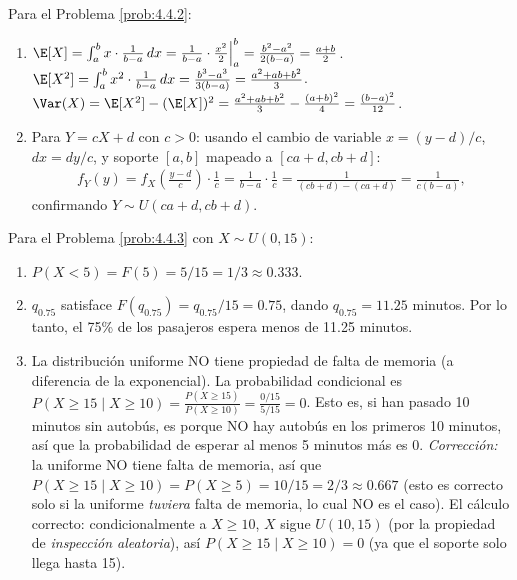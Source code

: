 \begin{solucion}
	\label{sol:4.4.2}
	Para el Problema \ref{prob:4.4.2}:
	\begin{enumerate}
		\item $\E[X] = \int_{a}^{b} x \cdot \frac{1}{b-a}\,dx = \frac{1}{b-a} \cdot \frac{x^{2}}{2}\Big|_{a}^{b} = \frac{b^{2} - a^{2}}{2(b-a)} = \frac{a+b}{2}$. $\E[X^{2}] = \int_{a}^{b} x^{2} \cdot \frac{1}{b-a}\,dx = \frac{b^{3} - a^{3}}{3(b-a)} = \frac{a^{2} + ab + b^{2}}{3}$. $\Var(X) = \E[X^{2}] - (\E[X])^{2} = \frac{a^{2} + ab + b^{2}}{3} - \frac{(a+b)^{2}}{4} = \frac{(b-a)^{2}}{12}$.
		\item Para $Y = cX + d$ con $c > 0$: usando el cambio de variable $x = (y-d)/c$, $dx = dy/c$, y soporte $[a, b]$ mapeado a $[ca+d, cb+d]$:
		\begin{align*}
			f_{Y}(y) = f_{X}\left(\frac{y-d}{c}\right) \cdot \frac{1}{c} = \frac{1}{b-a} \cdot \frac{1}{c} = \frac{1}{(cb+d) - (ca+d)} = \frac{1}{c(b-a)},
		\end{align*}
		confirmando $Y \sim U(ca+d, cb+d)$.
	\end{enumerate}
\end{solucion}

\begin{solucion}
	\label{sol:4.4.3}
	Para el Problema \ref{prob:4.4.3} con $X \sim U(0, 15)$:
	\begin{enumerate}
		\item $P(X < 5) = F(5) = 5/15 = 1/3 \approx 0.333$.
		\item $q_{0.75}$ satisface $F(q_{0.75}) = q_{0.75}/15 = 0.75$, dando $q_{0.75} = 11.25$ minutos. Por lo tanto, el 75\% de los pasajeros espera menos de 11.25 minutos.
		\item La distribución uniforme NO tiene propiedad de falta de memoria (a diferencia de la exponencial). La probabilidad condicional es $P(X \ge 15 \mid X \ge 10) = \frac{P(X \ge 15)}{P(X \ge 10)} = \frac{0/15}{5/15} = 0$. Esto es, si han pasado 10 minutos sin autobús, es porque NO hay autobús en los primeros 10 minutos, así que la probabilidad de esperar al menos 5 minutos más es 0. \emph{Corrección:} la uniforme NO tiene falta de memoria, así que $P(X \ge 15 \mid X \ge 10) = P(X \ge 5) = 10/15 = 2/3 \approx 0.667$ (esto es correcto solo si la uniforme \emph{tuviera} falta de memoria, lo cual NO es el caso). El cálculo correcto: condicionalmente a $X \ge 10$, $X$ sigue $U(10, 15)$ (por la propiedad de \emph{inspección aleatoria}), así $P(X \ge 15 \mid X \ge 10) = 0$ (ya que el soporte solo llega hasta 15).
	\end{enumerate}
\end{solucion}

